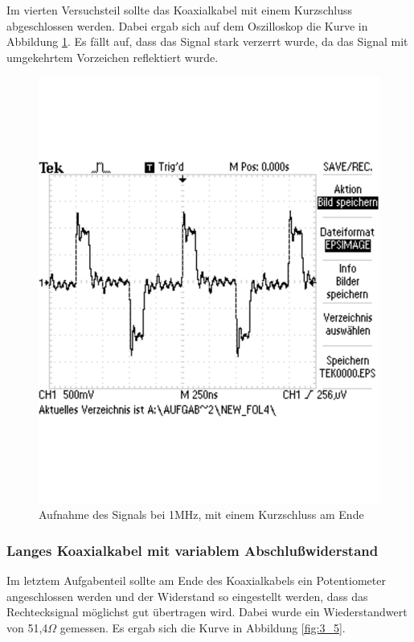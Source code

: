 \documentclass[12pt,a4paper]{article}
\begin{document}
Im vierten Versuchsteil sollte das Koaxialkabel mit einem Kurzschluss abgeschlossen werden. Dabei ergab sich auf dem Oszilloskop die Kurve in Abbildung \ref{fig:3_4}. Es fällt auf, dass das Signal stark verzerrt wurde, da das Signal mit umgekehrtem Vorzeichen reflektiert wurde.

\begin{figure}[H] 
  \centering
    \includegraphics[trim = 0cm 6cm 0cm 0cm,clip , scale = 0.5]{3_4.pdf}
  	\caption[Aufnahme des Signals bei 1MHz, mit einem Kurzschluss am Ende]{Aufnahme des Signals bei 1MHz, mit einem Kurzschluss am Ende}
  \label{fig:3_4}
\end{figure}

\subsubsection{Langes Koaxialkabel mit variablem Abschlußwiderstand}

Im letztem Aufgabenteil sollte am Ende des Koaxialkabels ein Potentiometer angeschlossen werden und der Widerstand so eingestellt werden, dass das Rechtecksignal möglichst gut übertragen wird. Dabei wurde ein Wiederstandwert von 51,4$\Omega$ gemessen. Es ergab sich die Kurve in Abbildung \ref{fig:3_5}.
\end{document}
